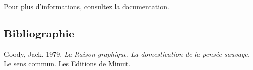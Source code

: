 \documentclass[12pt,french,letterpaper]{article}
\newlength{\cslhangindent}
\newlength{\cslentryspacingunit} %
\newenvironment{CSLReferences}[2] %
 {%
  \setlength{\parindent}{0pt}
  \ifodd #1
  \let\oldpar\par
  \def\par{\hangindent=\cslhangindent\oldpar}
  \fi
  \setlength{\parskip}{#2\cslentryspacingunit}
 }%
 {}
\begin{document}
Pour plus d'informations, consultez la documentation.

\hypertarget{bibliographie}{%
\subsection{Bibliographie}\label{bibliographie}}

\hypertarget{refs}{}
\begin{CSLReferences}{1}{0}
\leavevmode{}%
Goody, Jack. 1979. \emph{La {Raison} graphique. {La} domestication de la
pensée sauvage.} Le sens commun. Les Editions de Minuit.

\end{CSLReferences}
\end{document}
